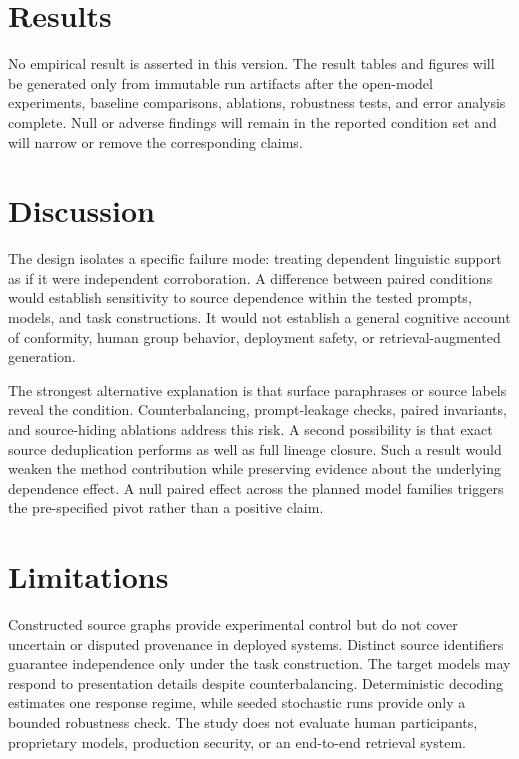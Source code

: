 \documentclass[11pt]{article}
\begin{document}
\section{Results}

No empirical result is asserted in this version. The result tables and figures will be generated only from immutable run artifacts after the open-model experiments, baseline comparisons, ablations, robustness tests, and error analysis complete. Null or adverse findings will remain in the reported condition set and will narrow or remove the corresponding claims.

\section{Discussion}

The design isolates a specific failure mode: treating dependent linguistic support as if it were independent corroboration. A difference between paired conditions would establish sensitivity to source dependence within the tested prompts, models, and task constructions. It would not establish a general cognitive account of conformity, human group behavior, deployment safety, or retrieval-augmented generation.

The strongest alternative explanation is that surface paraphrases or source labels reveal the condition. Counterbalancing, prompt-leakage checks, paired invariants, and source-hiding ablations address this risk. A second possibility is that exact source deduplication performs as well as full lineage closure. Such a result would weaken the method contribution while preserving evidence about the underlying dependence effect. A null paired effect across the planned model families triggers the pre-specified pivot rather than a positive claim.

\section{Limitations}

Constructed source graphs provide experimental control but do not cover uncertain or disputed provenance in deployed systems. Distinct source identifiers guarantee independence only under the task construction. The target models may respond to presentation details despite counterbalancing. Deterministic decoding estimates one response regime, while seeded stochastic runs provide only a bounded robustness check. The study does not evaluate human participants, proprietary models, production security, or an end-to-end retrieval system.
\end{document}
